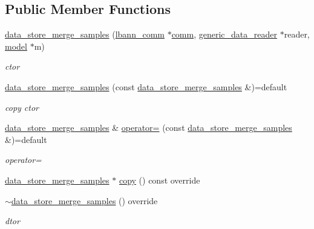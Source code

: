 \subsection*{Public Member Functions}
\begin{DoxyCompactItemize}
\item 
\hyperlink{classlbann_1_1data__store__merge__samples_ada5d181e33c9d9fe69979856b7f26268}{data\+\_\+store\+\_\+merge\+\_\+samples} (\hyperlink{classlbann_1_1lbann__comm}{lbann\+\_\+comm} $\ast$\hyperlink{file__io_8cpp_ab048c6f9fcbcfaa57ce68b00263dbebe}{comm}, \hyperlink{classlbann_1_1generic__data__reader}{generic\+\_\+data\+\_\+reader} $\ast$reader, \hyperlink{classlbann_1_1model}{model} $\ast$m)
\begin{DoxyCompactList}\small\item\em ctor \end{DoxyCompactList}\item 
\hyperlink{classlbann_1_1data__store__merge__samples_a0c42f42eaedbcf4be23fbb5b1f3d46b1}{data\+\_\+store\+\_\+merge\+\_\+samples} (const \hyperlink{classlbann_1_1data__store__merge__samples}{data\+\_\+store\+\_\+merge\+\_\+samples} \&)=default
\begin{DoxyCompactList}\small\item\em copy ctor \end{DoxyCompactList}\item 
\hyperlink{classlbann_1_1data__store__merge__samples}{data\+\_\+store\+\_\+merge\+\_\+samples} \& \hyperlink{classlbann_1_1data__store__merge__samples_a8723206ebe4ed829fbf968340ef71d8f}{operator=} (const \hyperlink{classlbann_1_1data__store__merge__samples}{data\+\_\+store\+\_\+merge\+\_\+samples} \&)=default
\begin{DoxyCompactList}\small\item\em operator= \end{DoxyCompactList}\item 
\hyperlink{classlbann_1_1data__store__merge__samples}{data\+\_\+store\+\_\+merge\+\_\+samples} $\ast$ \hyperlink{classlbann_1_1data__store__merge__samples_a37fc606c2347c6c6a24b588665e3cde5}{copy} () const override
\item 
\hyperlink{classlbann_1_1data__store__merge__samples_a29eb31269a1369f6f28439e90ed8ad49}{$\sim$data\+\_\+store\+\_\+merge\+\_\+samples} () override
\begin{DoxyCompactList}\small\item\em dtor \end{DoxyCompactList}\item 

\end{DoxyCompactItemize}
